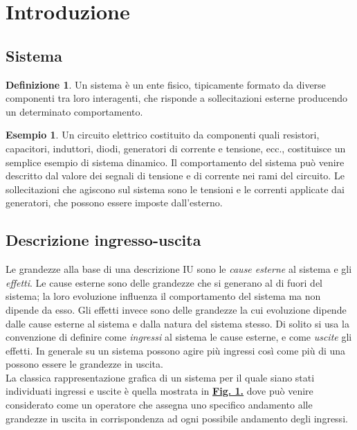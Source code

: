 \documentclass[a4paper]{article}
\theoremstyle{definition}
\newtheorem{exmp}{Esempio}[section]
\newtheorem{defn}{Definizione}[section]
\begin{document}
	\begin{frontespizio}
		\Titoletto{}
	\end{frontespizio}
	
	\tableofcontents
	
	\newpage
	
	\section{Introduzione}
	
	\subsection{Sistema}
		\begin{defn}
			Un sistema è un ente fisico, tipicamente formato da diverse componenti tra
			loro interagenti, che risponde a sollecitazioni esterne producendo un determinato
			comportamento.
		\end{defn}
		
		\begin{exmp}
			Un circuito elettrico costituito da componenti quali resistori, capacitori, induttori, diodi, generatori di corrente e tensione, ecc., costituisce un semplice esempio di sistema dinamico. Il comportamento del sistema può venire descritto dal valore dei segnali di tensione e di corrente nei rami del circuito. Le sollecitazioni che agiscono sul sistema sono le tensioni e le correnti applicate dai generatori, che
			possono essere imposte dall'esterno.
		\end{exmp}
		
	\subsection{Descrizione ingresso-uscita}
		Le grandezze alla base di una descrizione IU sono le \textit{cause esterne} al sistema e gli
		\textit{effetti}. Le cause esterne sono delle grandezze che si generano al di fuori del sistema;
		la loro evoluzione influenza il comportamento del sistema ma non dipende da esso.
		Gli effetti invece sono delle grandezze la cui evoluzione dipende dalle cause esterne
		al sistema e dalla natura del sistema stesso. Di solito si usa la convenzione di definire
		come \textit{ingressi} al sistema le cause esterne, e come \textit{uscite} gli effetti. In generale su un
		sistema possono agire più ingressi così come più di una possono essere le grandezze
		in uscita. \\
		La classica rappresentazione grafica di un sistema per il quale siano stati
		individuati ingressi e uscite è quella mostrata in \hyperref[fig:io]{\textbf{Fig. 1.}} dove può venire
		considerato come un operatore che assegna uno specifico andamento alle grandezze
		in uscita in corrispondenza ad ogni possibile andamento degli ingressi.
		
\end{document}
